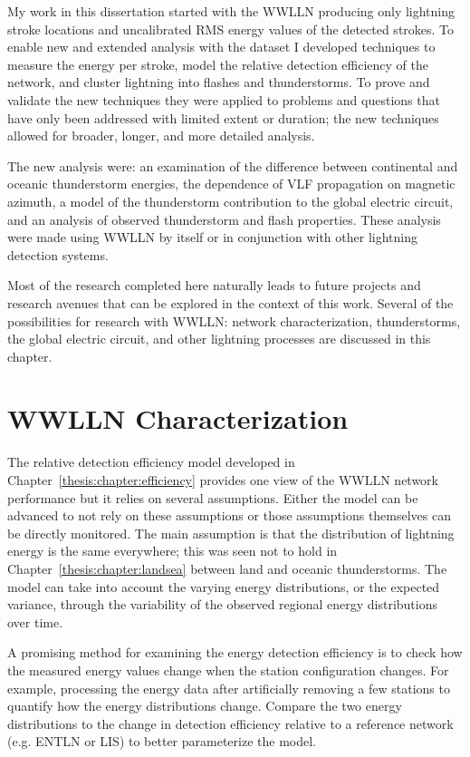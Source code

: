 My work in this dissertation started with the WWLLN producing only lightning stroke locations and uncalibrated RMS energy values of the detected strokes.
To enable new and extended analysis with the dataset I developed techniques to measure the energy per stroke, model the relative detection efficiency of the network, and cluster lightning into flashes and thunderstorms.
To prove and validate the new techniques they were applied to problems and questions that have only been addressed with limited extent or duration; the new techniques allowed for broader, longer, and more detailed analysis.

The new analysis were: an examination of the difference between continental and oceanic thunderstorm energies, the dependence of VLF propagation on magnetic azimuth, a model of the thunderstorm contribution to the global electric circuit, and an analysis of observed thunderstorm and flash properties.
These analysis were made using WWLLN by itself or in conjunction with other lightning detection systems.

Most of the research completed here naturally leads to future projects and research avenues that can be explored in the context of this work.
Several of the possibilities for research with WWLLN: network characterization, thunderstorms, the global electric circuit, and other lightning processes are discussed in this chapter.

\section{WWLLN Characterization}

The relative detection efficiency model developed in Chapter~\ref{thesis:chapter:efficiency} provides one view of the WWLLN network performance but it relies on several assumptions.
Either the model can be advanced to not rely on these assumptions or those assumptions themselves can be directly monitored.
The main assumption is that the distribution of lightning energy is the same everywhere; this was seen not to hold in Chapter~\ref{thesis:chapter:landsea} between land and oceanic thunderstorms.
The model can take into account the varying energy distributions, or the expected variance, through the variability of the observed regional energy distributions over time.

A promising method for examining the energy detection efficiency is to check how the measured energy values change when the station configuration changes.
For example, processing the energy data after artificially removing a few stations to quantify how the energy distributions change.
Compare the two energy distributions to the change in detection efficiency relative to a reference network (e.g. ENTLN or LIS) to better parameterize the model.

